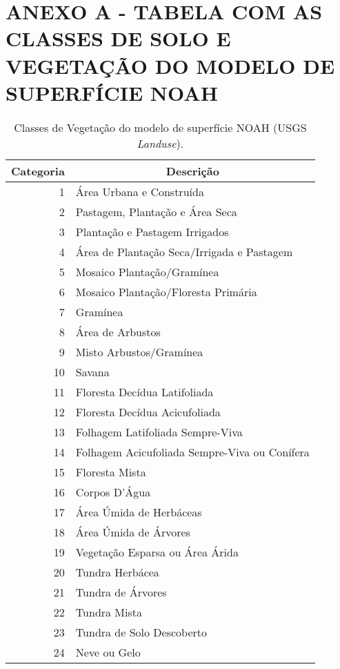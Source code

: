 \hypertarget{estilo:anexo}{}

\chapter{ANEXO A - TABELA COM AS CLASSES DE SOLO E VEGETAÇÃO DO MODELO DE SUPERFÍCIE NOAH}
\label{anexoA}

\begin{table}[htbp]
\caption{Classes de Vegetação do modelo de superfície NOAH (USGS \textit{Landuse}).}
\label{tab05}
\centering
\begin{tabular}{r|l|l|l|l|l}
\hline
\multicolumn{1}{l|}{Categoria} & \multicolumn{ 5}{c}{Descrição} \\ \hline
1  & \multicolumn{ 5}{l}{Área Urbana e Construída} \\
2  & \multicolumn{ 5}{l}{Pastagem, Plantação e Área Seca} \\
3  & \multicolumn{ 5}{l}{Plantação e Pastagem Irrigados} \\
4  & \multicolumn{ 5}{l}{Área de Plantação Seca/Irrigada e Pastagem} \\
5  & \multicolumn{ 5}{l}{Mosaico Plantação/Gramínea} \\
6  & \multicolumn{ 5}{l}{Mosaico Plantação/Floresta Primária} \\
7  & \multicolumn{ 5}{l}{Gramínea} \\
8  & \multicolumn{ 5}{l}{Área de Arbustos} \\
9  & \multicolumn{ 5}{l}{Misto Arbustos/Gramínea} \\
10 & \multicolumn{ 5}{l}{Savana} \\
11 & \multicolumn{ 5}{l}{Floresta Decídua Latifoliada} \\
12 & \multicolumn{ 5}{l}{Floresta Decídua Acicufoliada} \\
13 & \multicolumn{ 5}{l}{Folhagem Latifoliada Sempre-Viva} \\ 
14 & \multicolumn{ 5}{l}{Folhagem Acicufoliada Sempre-Viva ou Conífera} \\
15 & \multicolumn{ 5}{l}{Floresta Mista} \\
16 & \multicolumn{ 5}{l}{Corpos D'Água} \\
17 & \multicolumn{ 5}{l}{Área Úmida de Herbáceas} \\
18 & \multicolumn{ 5}{l}{Área Úmida de Árvores} \\
19 & \multicolumn{ 5}{l}{Vegetação Esparsa ou Área Árida} \\
20 & \multicolumn{ 5}{l}{Tundra Herbácea} \\
21 & \multicolumn{ 5}{l}{Tundra de Árvores} \\
22 & \multicolumn{ 5}{l}{Tundra Mista} \\
23 & \multicolumn{ 5}{l}{Tundra de Solo Descoberto} \\
24 & \multicolumn{ 5}{l}{Neve ou Gelo} \\ \hline
\end{tabular}
\label{Tabela das Classes de Vegetação}
\end{table}

